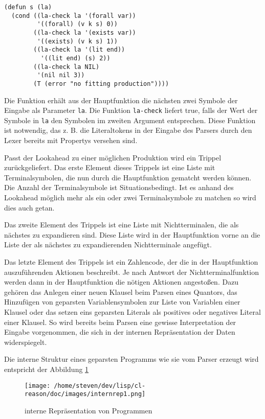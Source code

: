 \begin{verbatim}
(defun s (la)
  (cond ((la-check la '(forall var))
         '((forall) (v k s) 0))
        ((la-check la '(exists var))
         '((exists) (v k s) 1))
        ((la-check la '(lit end))
          '((lit end) (s) 2))
        ((la-check la NIL)
         '(nil nil 3))
        (T (error "no fitting production"))))
\end{verbatim}

Die Funktion erhält aus der Hauptfunktion die nächsten zwei Symbole der Eingabe als Parameter {\tt la}. Die Funktion {\tt la-check} liefert true, falls der Wert der Symbole in {\tt la} den Symbolen im zweiten Argument entsprechen. Diese Funktion ist notwendig, das z. B. die Literaltokens in der Eingabe des Parsers durch den Lexer bereits mit Propertys versehen sind.

Passt der Lookahead zu einer möglichen Produktion wird ein Trippel zurückgeliefert. Das erste Element dieses Trippels ist eine Liste mit Terminalsymbolen, die nun durch die Hauptfunktion gematcht werden können. Die Anzahl der Terminalsymbole ist Situationsbedingt. Ist es anhand des Lookahead möglich mehr als ein oder zwei Terminalsymbole zu matchen so wird dies auch getan.

Das zweite Element des Trippels ist eine Liste mit Nichtterminalen, die als nächstes zu expandieren sind. Diese Liste wird in der Hauptfunktion vorne an die Liste der als nächstes zu expandierenden Nichtterminale angefügt.

Das letzte Element des Trippels ist ein Zahlencode, der die in der Hauptfunktion auszuführenden Aktionen beschreibt. Je nach Antwort der Nichtterminalfunktion werden dann in der Hauptfunktion die nötigen Aktionen angestoßen. Dazu gehören das Anlegen einer neuen Klausel beim Parsen eines Quantors, das Hinzufügen von geparsten Variablensymbolen zur Liste von Variablen einer Klausel oder das setzen eins geparsten Literals als positives oder negatives Literal einer Klausel. So wird bereits beim Parsen eine gewisse Interpretation der Eingabe vorgenommen, die sich in der internen Repräsentation der Daten widerspiegelt.

Die interne Struktur eines geparsten Programms wie sie vom Parser erzeugt wird entspricht der Abbildung \ref{internrep1}

\begin{figure} %
	\centering
		\texttt{[image: /home/steven/dev/lisp/cl-reason/doc/images/internrep1.png]}
	\caption{interne Repräsentation von Programmen}
	\label{internrep1}
\end{figure}

